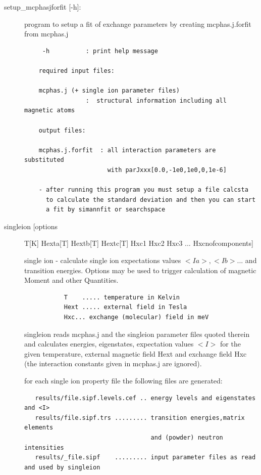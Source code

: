 \begin{description}
\item[\prg   setup\_mcphasjforfit  {[-h]}:] program to setup a fit of exchange parameters by   creating mcphas.j.forfit from mcphas.j
                    
\begin{verbatim}
     -h          : print help message

    required input files:

    mcphas.j (+ single ion parameter files)
                 :  structural information including all magnetic atoms

    output files:

    mcphas.j.forfit  : all interaction parameters are substituted
                       with parJxxx[0.0,-1e0,1e0,0,1e-6]

    - after running this program you must setup a file calcsta 
      to calculate the standard deviation and then you can start
      a fit by simannfit or searchspace
\end{verbatim}

\item [\prg singleion [options] T[K] Hexta[T] Hextb[T] Hextc[T] Hxc1 Hxc2 Hxc3 ... Hxcnofcomponents]
 single ion  - calculate single ion expectations values $<Ia>, <Ib> $... and transition energies.
 Options may be used to trigger calculation of magnetic Moment and other Quantities.
\begin{verbatim} 
           T    ..... temperature in Kelvin
           Hext ..... external field in Tesla 
           Hxc... exchange (molecular) field in meV   
\end{verbatim}
{\prg singleion} reads {\prg mcphas.j} and the singleion parameter files quoted therein
and calculates energies, eigenstates, expectation values $<I>$ for the given
temperature, external magnetic field Hext and exchange field Hxc (the
interaction constants given in mcphas.j are ignored).

for each single ion property file the following files are generated:
\begin{verbatim}
   results/file.sipf.levels.cef .. energy levels and eigenstates and <I>
   results/file.sipf.trs ......... transition energies,matrix elements
                                   and (powder) neutron intensities
   results/_file.sipf    ......... input parameter files as read and used by singleion 


\end{verbatim}
\end{description}
